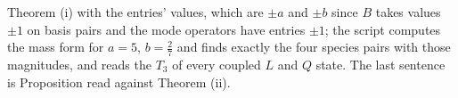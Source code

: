 Theorem (i) with the entries' values, which are $\pm a$ and $\pm b$ since $B$ takes values $\pm 1$ on basis pairs and the mode operators have entries $\pm 1$; the script computes the mass form for $a = 5$, $b = \tfrac27$ and finds exactly the four species pairs with those magnitudes, and reads the $T_{3}$ of every coupled $L$ and $Q$ state. The last sentence is Proposition  read against Theorem (ii).
